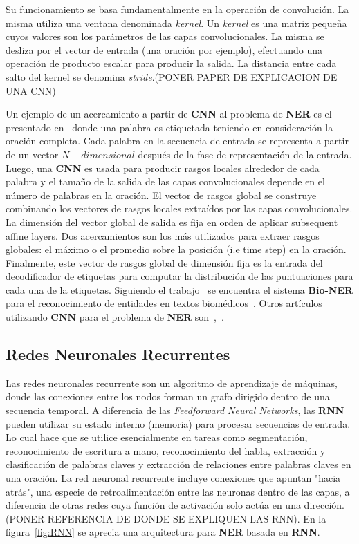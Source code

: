 Su funcionamiento se basa fundamentalmente en la operaci\'on de convoluci\'on. La misma utiliza una ventana denominada \emph{kernel}. Un \emph{kernel} es una matriz pequeña cuyos valores son los par\'ametros de las capas convolucionales. La misma se desliza por el vector de entrada (una oraci\'on por ejemplo), efectuando una operaci\'on de producto escalar para producir la salida. La distancia entre cada salto del kernel se denomina \emph{stride}.(PONER PAPER DE EXPLICACION DE UNA CNN) 

Un ejemplo de un acercamiento a partir de \textbf{CNN} al problema de \textbf{NER} es el presentado en~\cite{collobert2011natural} donde una palabra es etiquetada teniendo en consideraci\'on la oraci\'on completa. Cada palabra en la secuencia de entrada se representa a partir de un vector $N-dimensional$ despu\'es de la fase de representaci\'on de la entrada. Luego, una \textbf{CNN} es usada para producir rasgos locales alrededor de cada palabra y el tama\~no de la salida de las capas convolucionales depende en el n\'umero de palabras en la oraci\'on. El vector de rasgos global se construye combinando los vectores de rasgos locales extra\'idos por las capas convolucionales. La dimensi\'on del vector global de salida es fija en orden de aplicar subsequent affine layers. Dos acercamientos son los m\'as utilizados para extraer rasgos globales: el m\'aximo o el promedio sobre la posici\'on (i.e time step) en la oraci\'on. Finalmente, este vector de rasgos global de dimensi\'on fija es la entrada del decodificador de etiquetas para computar la distribuci\'on de las puntuaciones para cada una de la etiquetas. Siguiendo el trabajo~\cite{collobert2011natural} se encuentra el sistema \textbf{Bio-NER} para el reconocimiento de entidades en textos biom\'edicos~\cite{yao2015biomedical}. Otros art\'iculos utilizando \textbf{CNN} para el problema de \textbf{NER} son~\cite{strubell2017fast},~\cite{zhou2017joint}.

\subsection{Redes Neuronales Recurrentes}

Las redes neuronales recurrente son un algoritmo de aprendizaje de m\'aquinas, donde las conexiones entre los nodos forman un grafo dirigido dentro de una secuencia temporal. A diferencia de las \emph{Feedforward Neural Networks}, las \textbf{RNN} pueden utilizar su estado interno (memoria) para procesar secuencias de entrada. Lo cual hace que se utilice esencialmente en tareas como segmentaci\'on, reconocimiento de escritura a mano, reconocimiento del habla, extracci\'on y clasificaci\'on de palabras claves y extracci\'on de relaciones entre palabras claves en una oraci\'on. La red neuronal recurrente incluye conexiones que apuntan "hacia atr\'as", una especie de retroalimentaci\'on entre las neuronas dentro de las capas, a diferencia de otras redes cuya funci\'on de activaci\'on solo act\'ua en una direcci\'on.(PONER REFERENCIA DE DONDE SE EXPLIQUEN LAS RNN). En la figura~\ref{fig:RNN} se aprecia una arquitectura para \textbf{NER} basada en \textbf{RNN}.

